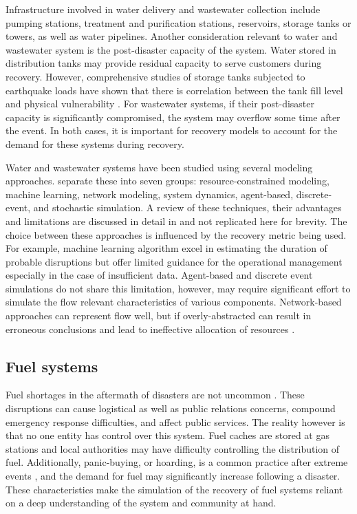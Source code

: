 Infrastructure involved in water delivery and wastewater collection include pumping stations, treatment and purification stations, reservoirs, storage tanks or towers, as well as water pipelines. Another consideration relevant to water and wastewater system is the post-disaster capacity of the system. Water stored in distribution tanks may provide residual capacity to serve customers during recovery. However, comprehensive studies of storage tanks subjected to earthquake loads have shown that there is correlation between the tank fill level and physical vulnerability \citep{o2000seismic, eidinger2012recent, cooper1997study}. For wastewater systems, if their post-disaster capacity is significantly compromised, the system may overflow some time after the event. In both cases, it is important for recovery models to account for the demand for these systems during recovery.\

Water and wastewater systems have been studied using several modeling approaches. \cite{miles2019community} separate these into seven groups: resource-constrained modeling, machine learning, network modeling, system dynamics, agent-based, discrete-event, and stochastic simulation. A review of these techniques, their advantages and limitations are discussed in detail in \cite{miles2019community} and not replicated here for brevity. The choice between these approaches is influenced by the recovery metric being used. For example, machine learning algorithm excel in estimating the duration of probable disruptions but offer limited guidance for the operational management especially in the case of insufficient data. Agent-based and discrete event simulations do not share this limitation, however, may require significant effort to simulate the flow relevant characteristics of various components. Network-based approaches can represent flow well, but if overly-abstracted can result in erroneous conclusions and lead to ineffective allocation of resources \citep{Hines2010a}. \

\subsection{Fuel systems}
Fuel shortages in the aftermath of disasters are not uncommon \citep{Smythe2013, Holguin-Veras2014}. These disruptions can cause logistical as well as public relations concerns, compound emergency response difficulties, and affect public services. The reality however is that no one entity has control over this system. Fuel caches are stored at gas stations and local authorities may have difficulty controlling the distribution of fuel. Additionally, panic-buying, or hoarding, is a common practice after extreme events \citep{Shen_2017, helbing2006disasters}, and the demand for fuel may significantly increase following a disaster. These characteristics make the simulation of the recovery of fuel systems reliant on a deep understanding of the system and community at hand. \


